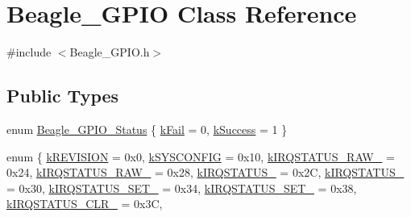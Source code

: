 \hypertarget{class_beagle___g_p_i_o}{\section{\-Beagle\-\_\-\-G\-P\-I\-O \-Class \-Reference}
\label{class_beagle___g_p_i_o}
}


{\ttfamily \#include $<$\-Beagle\-\_\-\-G\-P\-I\-O.\-h$>$}

\subsection*{\-Public \-Types}
\begin{DoxyCompactItemize}
\item 
enum \hyperlink{class_beagle___g_p_i_o_a40ebd672d74de41bbf5944109e1302ee}{\-Beagle\-\_\-\-G\-P\-I\-O\-\_\-\-Status} \{ \hyperlink{class_beagle___g_p_i_o_a40ebd672d74de41bbf5944109e1302eea115553a9517b306e3bf301889cfc8e8b}{k\-Fail} =  0, 
\hyperlink{class_beagle___g_p_i_o_a40ebd672d74de41bbf5944109e1302eea67ec988d80fec5692e8b893c795da682}{k\-Success} =  1
 \}
\item 
enum \{ \*
\hyperlink{class_beagle___g_p_i_o_ac841d5ad729ca3eec9ddeda852086a28a4733479f85bb944ca3b7a3ac587edd12}{k\-R\-E\-V\-I\-S\-I\-O\-N} =  0x0, 
\hyperlink{class_beagle___g_p_i_o_ac841d5ad729ca3eec9ddeda852086a28a67dc1bc91624f33b689b1e669e2906ce}{k\-S\-Y\-S\-C\-O\-N\-F\-I\-G} =  0x10, 
\hyperlink{class_beagle___g_p_i_o_ac841d5ad729ca3eec9ddeda852086a28a468e61836dc15650b6fbf4db514a7ab6}{k\-I\-R\-Q\-S\-T\-A\-T\-U\-S\-\_\-\-R\-A\-W\-\_} =  0x24, 
\hyperlink{class_beagle___g_p_i_o_ac841d5ad729ca3eec9ddeda852086a28a1a763f396960bf29deb9ef201da940d2}{k\-I\-R\-Q\-S\-T\-A\-T\-U\-S\-\_\-\-R\-A\-W\-\_} =  0x28, 
\*
\hyperlink{class_beagle___g_p_i_o_ac841d5ad729ca3eec9ddeda852086a28a0e986029016be5c7fb13650516bd3f3c}{k\-I\-R\-Q\-S\-T\-A\-T\-U\-S\-\_} =  0x2\-C, 
\hyperlink{class_beagle___g_p_i_o_ac841d5ad729ca3eec9ddeda852086a28a96b61f40f64daae7246c43bc053f1daf}{k\-I\-R\-Q\-S\-T\-A\-T\-U\-S\-\_} =  0x30, 
\hyperlink{class_beagle___g_p_i_o_ac841d5ad729ca3eec9ddeda852086a28a40d1c2177900e08fa0a82f32a843c096}{k\-I\-R\-Q\-S\-T\-A\-T\-U\-S\-\_\-\-S\-E\-T\-\_} =  0x34, 
\hyperlink{class_beagle___g_p_i_o_ac841d5ad729ca3eec9ddeda852086a28a4a85feeabc32101602bbe924dafc701d}{k\-I\-R\-Q\-S\-T\-A\-T\-U\-S\-\_\-\-S\-E\-T\-\_} =  0x38, 
\*
\hyperlink{class_beagle___g_p_i_o_ac841d5ad729ca3eec9ddeda852086a28a4ffdf38ac5eca208f2498ab48d65245c}{k\-I\-R\-Q\-S\-T\-A\-T\-U\-S\-\_\-\-C\-L\-R\-\_} =  0x3\-C, 

\end{DoxyCompactItemize}
